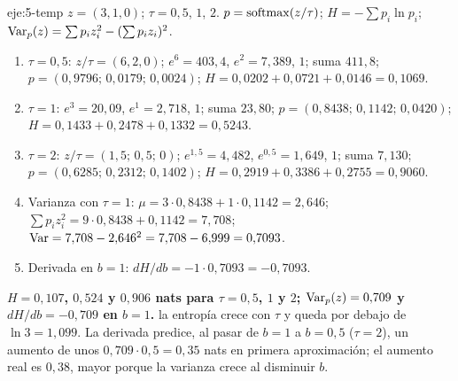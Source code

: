 \begin{solucion}{eje:5-temp}
\datos $z=(3,1,0)$; $\tau=0{,}5$, $1$, $2$.
\planteamiento $p=\operatorname{softmax}(z/\tau)$; $H=-\sum p_i\ln p_i$; $\operatorname{Var}_p(z)=\sum p_iz_i^{2}-(\sum p_iz_i)^{2}$.
\pasos
\begin{enumerate}[label=\arabic*.]
  \item $\tau=0{,}5$: $z/\tau=(6,2,0)$; $e^{6}=403{,}4$, $e^{2}=7{,}389$, $1$; suma $411{,}8$; $p=(0{,}9796;\allowbreak\,0{,}0179;\allowbreak\,0{,}0024)$; $H=0{,}0202+0{,}0721+0{,}0146=0{,}1069$.
  \item $\tau=1$: $e^{3}=20{,}09$, $e^{1}=2{,}718$, $1$; suma $23{,}80$; $p=(0{,}8438;\allowbreak\,0{,}1142;\allowbreak\,0{,}0420)$; $H=0{,}1433+0{,}2478+0{,}1332=0{,}5243$.
  \item $\tau=2$: $z/\tau=(1{,}5;\allowbreak\,0{,}5;\allowbreak\,0)$; $e^{1{,}5}=4{,}482$, $e^{0{,}5}=1{,}649$, $1$; suma $7{,}130$; $p=(0{,}6285;\allowbreak\,0{,}2312;\allowbreak\,0{,}1402)$; $H=0{,}2919+0{,}3386+0{,}2755=0{,}9060$.
  \item Varianza con $\tau=1$: $\mu=3\cdot 0{,}8438+1\cdot 0{,}1142=2{,}646$; $\sum p_iz_i^{2}=9\cdot 0{,}8438+0{,}1142=7{,}708$; $\operatorname{Var}=7{,}708-2{,}646^{2}=7{,}708-6{,}999=0{,}7093$.
  \item Derivada en $b=1$: $dH/db=-1\cdot 0{,}7093=-0{,}7093$.
\end{enumerate}
\resultado \textbf{$H=0{,}107$, $0{,}524$ y $0{,}906$ nats para $\tau=0{,}5$, $1$ y $2$; $\operatorname{Var}_p(z)=0{,}709$ y $dH/db=-0{,}709$ en $b=1$.}
\comprobacion la entropía crece con $\tau$ y queda por debajo de $\ln 3=1{,}099$. La derivada predice, al pasar de $b=1$ a $b=0{,}5$ ($\tau=2$), un aumento de unos $0{,}709\cdot 0{,}5=0{,}35$ nats en primera aproximación; el aumento real es $0{,}38$, mayor porque la varianza crece al disminuir $b$.
\end{solucion}

